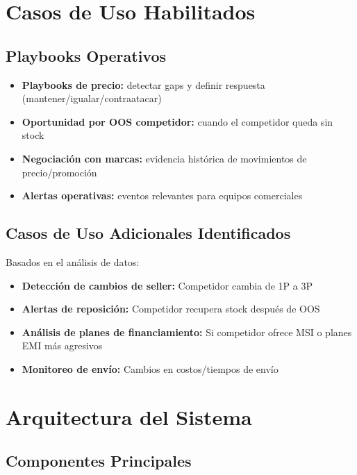 \documentclass[12pt,a4paper]{article}
\begin{document}
\section{Casos de Uso Habilitados}

\subsection{Playbooks Operativos}
\begin{itemize}[leftmargin=*]
    \item \textbf{Playbooks de precio:} detectar gaps y definir respuesta (mantener/igualar/contraatacar)
    \item \textbf{Oportunidad por OOS competidor:} cuando el competidor queda sin stock
    \item \textbf{Negociación con marcas:} evidencia histórica de movimientos de precio/promoción
    \item \textbf{Alertas operativas:} eventos relevantes para equipos comerciales
\end{itemize}

\subsection{Casos de Uso Adicionales Identificados}

Basados en el análisis de datos:
\begin{itemize}[leftmargin=*]
    \item \textbf{Detección de cambios de seller:} Competidor cambia de 1P a 3P
    \item \textbf{Alertas de reposición:} Competidor recupera stock después de OOS
    \item \textbf{Análisis de planes de financiamiento:} Si competidor ofrece MSI o planes EMI más agresivos
    \item \textbf{Monitoreo de envío:} Cambios en costos/tiempos de envío
\end{itemize}

\section{Arquitectura del Sistema}

\subsection{Componentes Principales}
\end{document}
